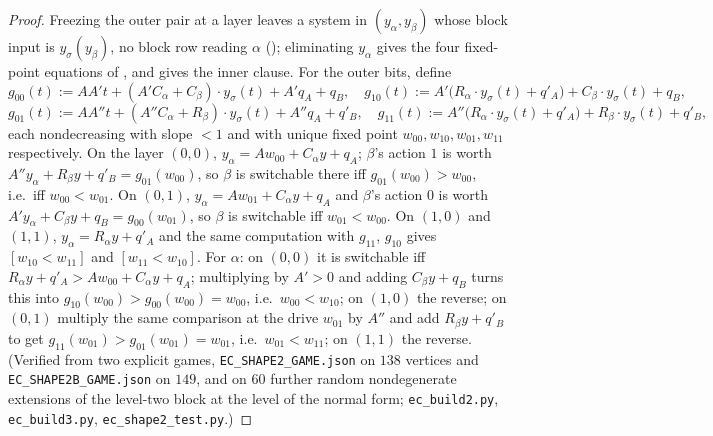 \begin{proof}
Freezing the outer pair at a layer leaves a system in $(y_\alpha,y_\beta)$ whose block input is
$y_\sigma(y_\beta)$, no block row reading $\alpha$ (); eliminating $y_\alpha$
gives the four fixed-point equations of , and  gives the
inner clause. For the outer bits, define
\[
 g_{00}(t):=AA't+(A'C_\alpha+C_\beta)\cdot y_\sigma(t)+A'q_A+q_B,\quad
 g_{10}(t):=A'\bigl(R_\alpha\cdot y_\sigma(t)+q'_A\bigr)+C_\beta\cdot y_\sigma(t)+q_B,
\]
\[
 g_{01}(t):=AA''t+(A''C_\alpha+R_\beta)\cdot y_\sigma(t)+A''q_A+q'_B,\quad
 g_{11}(t):=A''\bigl(R_\alpha\cdot y_\sigma(t)+q'_A\bigr)+R_\beta\cdot y_\sigma(t)+q'_B,
\]
each nondecreasing with slope $<1$ and with unique fixed point $w_{00},w_{10},w_{01},w_{11}$
respectively. On the layer $(0,0)$, $y_\alpha=Aw_{00}+C_\alpha y+q_A$; $\beta$'s action $1$ is
worth $A''y_\alpha+R_\beta y+q'_B=g_{01}(w_{00})$, so $\beta$ is switchable there iff
$g_{01}(w_{00})>w_{00}$, i.e.\ iff $w_{00}<w_{01}$. On $(0,1)$, $y_\alpha=Aw_{01}+C_\alpha y+q_A$
and $\beta$'s action $0$ is worth $A'y_\alpha+C_\beta y+q_B=g_{00}(w_{01})$, so $\beta$ is
switchable iff $w_{01}<w_{00}$. On $(1,0)$ and $(1,1)$, $y_\alpha=R_\alpha y+q'_A$ and the same
computation with $g_{11}$, $g_{10}$ gives $[w_{10}<w_{11}]$ and $[w_{11}<w_{10}]$. For $\alpha$:
on $(0,0)$ it is switchable iff $R_\alpha y+q'_A>Aw_{00}+C_\alpha y+q_A$; multiplying by $A'>0$
and adding $C_\beta y+q_B$ turns this into $g_{10}(w_{00})>g_{00}(w_{00})=w_{00}$, i.e.\
$w_{00}<w_{10}$; on $(1,0)$ the reverse; on $(0,1)$ multiply the same comparison at the drive
$w_{01}$ by $A''$ and add $R_\beta y+q'_B$ to get $g_{11}(w_{01})>g_{01}(w_{01})=w_{01}$, i.e.\
$w_{01}<w_{11}$; on $(1,1)$ the reverse. (Verified from two explicit games,
\texttt{EC\_SHAPE2\_GAME.json} on $138$ vertices and \texttt{EC\_SHAPE2B\_GAME.json} on $149$,
and on $60$ further random nondegenerate extensions of the level-two block at the level of the
normal form; \texttt{ec\_build2.py}, \texttt{ec\_build3.py}, \texttt{ec\_shape2\_test.py}.)
\end{proof}


